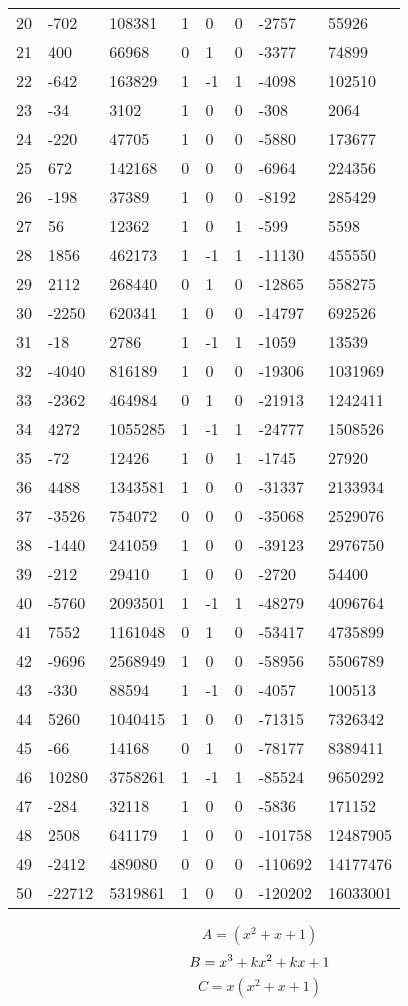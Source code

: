 \documentclass{amsart}
\begin{document}
\begin{longtable}{|l|l|l|lllll|}
20&-702&108381&1&0&0&-2757&55926\\
21&400&66968&0&1&0&-3377&74899\\
22&-642&163829&1&-1&1&-4098&102510\\
23&-34&3102&1&0&0&-308&2064\\
24&-220&47705&1&0&0&-5880&173677\\
25&672&142168&0&0&0&-6964&224356\\
26&-198&37389&1&0&0&-8192&285429\\
27&56&12362&1&0&1&-599&5598\\
28&1856&462173&1&-1&1&-11130&455550\\
29&2112&268440&0&1&0&-12865&558275\\
30&-2250&620341&1&0&0&-14797&692526\\
31&-18&2786&1&-1&1&-1059&13539\\
32&-4040&816189&1&0&0&-19306&1031969\\
33&-2362&464984&0&1&0&-21913&1242411\\
34&4272&1055285&1&-1&1&-24777&1508526\\
35&-72&12426&1&0&1&-1745&27920\\
36&4488&1343581&1&0&0&-31337&2133934\\
37&-3526&754072&0&0&0&-35068&2529076\\
38&-1440&241059&1&0&0&-39123&2976750\\
39&-212&29410&1&0&0&-2720&54400\\
40&-5760&2093501&1&-1&1&-48279&4096764\\
41&7552&1161048&0&1&0&-53417&4735899\\
42&-9696&2568949&1&0&0&-58956&5506789\\
43&-330&88594&1&-1&0&-4057&100513\\
44&5260&1040415&1&0&0&-71315&7326342\\
45&-66&14168&0&1&0&-78177&8389411\\
46&10280&3758261&1&-1&1&-85524&9650292\\
47&-284&32118&1&0&0&-5836&171152\\
48&2508&641179&1&0&0&-101758&12487905\\
49&-2412&489080&0&0&0&-110692&14177476\\
50&-22712&5319861&1&0&0&-120202&16033001\\
\hline
\end{longtable}
$$A=(x^2
 + x
 + 1)$$
$$B=x^3
 + k\*x^2
 + k\*x
 + 1$$
$$C=x(x^2
 + x
 + 1)$$
\end{document}

